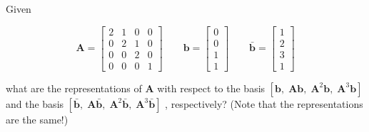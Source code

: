 \item [3.12] Given

\begin{equation*}
 \mathbf{A} = \begin{bmatrix}
      2 & 1 & 0 & 0 \\
      0 & 2 & 1 & 0 \\
      0 & 0 & 2 & 0 \\
      0 & 0 & 0 & 1
     \end{bmatrix}
\qquad
\mathbf{b} = \begin{bmatrix}
     0 \\
     0 \\
     1 \\
     1
    \end{bmatrix}
\qquad
\bar{\mathbf{b}} = \begin{bmatrix}
          1 \\
          2\\
          3\\
          1
         \end{bmatrix}
\end{equation*}

what are the representations of $\mathbf{A}$
with respect to the basis
$[\mathbf{b}, \; \mathbf{A}\mathbf{b}, \; \mathbf{A}^2 \mathbf{b},\; \mathbf{A}^3\mathbf{b}]$
and the basis
$[\bar{\mathbf{b}}, \; \mathbf{A} \bar{\mathbf{b}}, \; \mathbf{A}^2 \bar{\mathbf{b}},\; \mathbf{A}^3 \bar{\mathbf{b}}]$
, respectively?
(Note that the representations are the same!)

